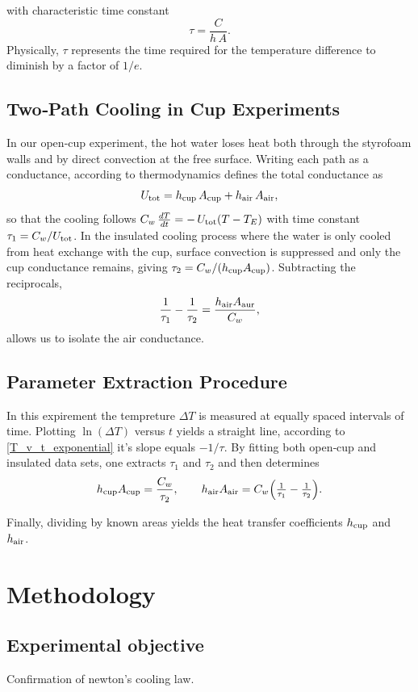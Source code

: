 \documentclass[12pt,a4paper]{report}
\begin{document}
with characteristic time constant
\[
\tau = \frac{C}{h\,A}.
\]
Physically, $\tau$ represents the time required for the temperature difference to diminish by a factor of $1/e$.

\subsection{Two‐Path Cooling in Cup Experiments}
In our open‐cup experiment, the hot water loses heat both through the styrofoam walls and by direct convection at the free surface. Writing each path as a conductance, according to thermodynamics defines the total conductance as
\[
U_{\rm tot} = h_{\rm cup}\,A_{\rm cup} + h_{\rm air}\,A_{\rm air},
\]
so that the cooling follows $C_w\,\frac{dT}{dt} = -\,U_{\rm tot}(T-T_E)$ with time constant $\tau_1=C_w/U_{\rm tot}$. In the insulated cooling process where the water is only cooled from heat exchange with the cup, surface convection is suppressed and only the cup conductance remains, giving $\tau_2=C_w/(h_{\rm cup}A_{\rm cup})$. Subtracting the reciprocals,
\[
\frac1{\tau_1} - \frac1{\tau_2} = \frac{h_{\rm air}A_{\rm aur}}{C_w},
\]
allows us to isolate the air conductance.

\subsection{Parameter Extraction Procedure}
 In this expirement the tempreture $\Delta T$ is measured at equally spaced intervals of time. Plotting $\ln(\Delta T )$ versus $t$ yields a straight line, according to \eqref{T_v_t_exponential} it's slope equals $-1/\tau$. By fitting both open‐cup and insulated data sets, one extracts $\tau_1$ and $\tau_2$ and then determines
\begin{equation}
    h_{\rm cup}A_{\rm cup} = \frac{C_w}{\tau_2},\qquad
h_{\rm air}A_{\rm air} = C_w\Bigl(\tfrac1{\tau_1}-\tfrac1{\tau_2}\Bigr).
\end{equation}

Finally, dividing by known areas yields the heat transfer coefficients $h_{\rm cup}$ and $h_{\rm air}$.

\section{Methodology}
\subsection{Experimental objective}
Confirmation of newton's cooling law.
\end{document}
